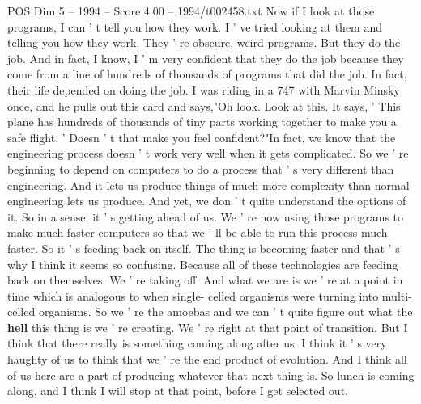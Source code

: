 \begin{textsample}{POS Dim 5 – 1994 – Score 4.00 – 1994/t002458.txt}
Now if I look at those programs, I can ' t tell you how they work.
I ' ve tried looking at them and telling you how they work.
They ' re obscure, weird programs.
But they do the job.
And in fact, I know, I ' m very confident that they do the job because they come from a line of hundreds of thousands of programs that did the job.
In fact, their life depended on doing the job.
I was riding in a 747 with Marvin Minsky once, and he pulls out this card and says,"Oh look.
Look at this.
It says, ' This plane has hundreds of thousands of tiny parts working together to make you a safe flight. ' Doesn ' t that make you feel confident?"In fact, we know that the engineering process doesn ' t work very well when it gets complicated.
So we ' re beginning to depend on computers to do a process that ' s very different than engineering.
And it lets us produce things of much more complexity than normal engineering lets us produce.
And yet, we don ' t quite understand the options of it.
So in a sense, it ' s getting ahead of us.
We ' re now using those programs to make much faster computers so that we ' ll be able to run this process much faster.
So it ' s feeding back on itself.
The thing is becoming faster and that ' s why I think it seems so confusing.
Because all of these technologies are feeding back on themselves.
We ' re taking off.
And what we are is we ' re at a point in time which is analogous to when single- celled organisms were turning into multi-celled organisms.
So we ' re the amoebas and we can ' t quite figure out what the \textbf{hell} this thing is we ' re creating.
We ' re right at that point of transition.
But I think that there really is something coming along after us.
I think it ' s very haughty of us to think that we ' re the end product of evolution.
And I think all of us here are a part of producing whatever that next thing is.
So lunch is coming along, and I think I will stop at that point, before I get selected out.

\end{textsample}
